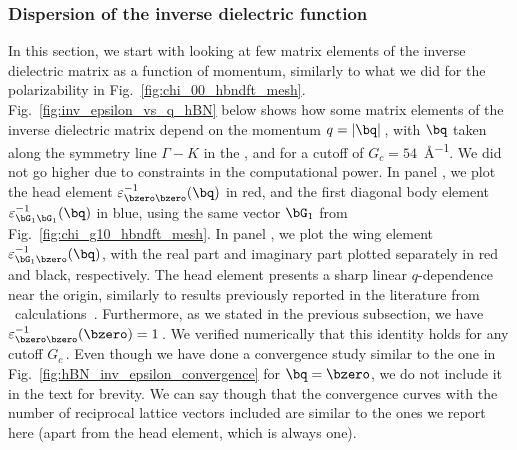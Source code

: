 \subsubsection{Dispersion of the inverse dielectric function}
\label{subsubsec:macroscopic_dielectric_function}

In this section, we start with looking at few matrix elements of the inverse dielectric matrix as a function of momentum, similarly to what we did for the polarizability in Fig.~\ref{fig:chi_00_hbndft_mesh}.
Fig.~\ref{fig:inv_epsilon_vs_q_hBN} below shows how some matrix elements of the inverse dielectric matrix depend on the momentum $q=|\bq|$\,, with $\bq$ taken along the symmetry line $\Gamma-K$ in the \bz, and for a cutoff of $G_c = 54$~\unit{\angstrom^{-1}}.
We did not go higher due to constraints in the computational power.
In panel , we plot the head element $\varepsilon^{-1}_{\bzero \bzero} (\bq)$ in red, and the first diagonal body element $\varepsilon^{-1}_{\bG_1 \bG_1} (\bq)$ in blue, using the same vector $\bG_1$ from Fig.~\ref{fig:chi_g10_hbndft_mesh}.
In panel , we plot the wing element $\varepsilon^{-1}_{\bG_1 \bzero} (\bq)$, with the real part and imaginary part plotted separately in red and black, respectively.
The head element presents a sharp linear $q$-dependence near the origin, similarly to results previously reported in the literature from \abinit~calculations~\cite{Guandalini_Varsano_2023,Ismail-Beigi_2006,BerkeleyGW,Huser_Olsen_Thygesen_2013}.
Furthermore, as we stated in the previous subsection, we have $\varepsilon^{-1}_{\bzero \bzero} (\bzero) = 1$\,.
We verified numerically that this identity holds for any cutoff $G_c$\,.
Even though we have done a convergence study similar to the one in Fig.~\ref{fig:hBN_inv_epsilon_convergence} for $\bq = \bzero$, we do not include it in the text for brevity.
We can say though that the convergence curves with the number of reciprocal lattice vectors included are similar to the ones we report here (apart from the head element, which is always one).

